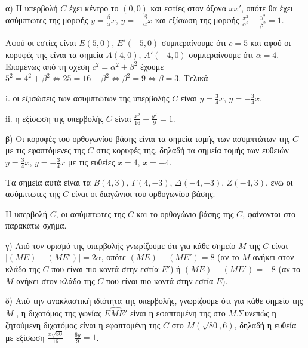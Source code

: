 α) Η υπερβολή $C$ έχει κέντρο το $(0,0)$ και εστίες στον άξονα $xx'$, οπότε θα έχει ασύμπτωτες της μορφής $y = \frac{\beta}{\alpha} x$, $y = -\frac{\beta}{\alpha} x$ και εξίσωση της μορφής $\frac{x^2}{\alpha^2} - \frac{y^2}{\beta^2} = 1$.

Αφού οι εστίες είναι $E(5,0)$, $E'(-5,0)$ συμπεραίνουμε ότι $c=5$ και αφού οι κορυφές της είναι τα σημεία $A(4,0)$, $A'(-4,0)$ συμπεραίνουμε ότι $\alpha=4$. Επομένως από τη σχέση $c^2 = \alpha^2 + \beta^2$ έχουμε $5^2 = 4^2 + \beta^2 \Leftrightarrow 25 = 16 + \beta^2 \Leftrightarrow \beta^2 = 9 \Leftrightarrow \beta=3$. Τελικά

i. οι εξισώσεις των ασυμπτώτων της υπερβολής $C$ είναι $y = \frac{3}{4} x$, $y = -\frac{3}{4} x$.

ii. η εξίσωση της υπερβολής $C$ είναι $\frac{x^2}{16} - \frac{y^2}{9} = 1$.

β) Οι κορυφές του ορθογωνίου βάσης είναι τα σημεία τομής των ασυμπτώτων της $C$ με τις εφαπτόμενες της $C$ στις κορυφές της, δηλαδή τα σημεία τομής των ευθειών $y = \frac{3}{4}x$, $y = -\frac{3}{4}x$ με τις ευθείες $x=4$, $x=-4$.

Τα σημεία αυτά είναι τα $B(4,3)$, $\Gamma(4,-3)$, $\Delta(-4,-3)$, $Z(-4,3)$, ενώ οι ασύμπτωτες της $C$ είναι οι διαγώνιοι του ορθογωνίου βάσης.

Η υπερβολή $C$, οι ασύμπτωτες της $C$ και το ορθογώνιο βάσης της $C$, φαίνονται στο παρακάτω σχήμα.


γ) Από τον ορισμό της υπερβολής γνωρίζουμε ότι για κάθε σημείο $M$ της $C$ είναι $|(ME)-(ME')|=2\alpha$, οπότε $(ME)-(ME')=8$ (αν το $M$ ανήκει στον κλάδο της $C$ που είναι πιο κοντά στην εστία $E'$) ή $(ME)-(ME')=-8$ (αν το $M$ ανήκει στον κλάδο της $C$ που είναι πιο κοντά στην εστία $E$).

δ) Από την ανακλαστική ιδιότητα της υπερβολής, γνωρίζουμε ότι για κάθε σημείο της $M$ , η διχοτόμος της γωνίας $\widehat{EME'}$ είναι η εφαπτομένη της στο $M$.Συνεπώς η ζητούμενη διχοτόμος είναι η εφαπτομένη της $C$ στο $M(\sqrt{80},6)$, δηλαδή η ευθεία με εξίσωση $\frac{x \sqrt{80}}{16} - \frac{6y}{9} = 1$.